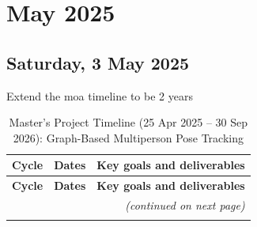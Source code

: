 \chapter[2025 May]{May 2025}

\section[2025/03/05]{Saturday, 3 May 2025}
\label{sec:20250305}

Extend the moa timeline to be 2 years

\begin{longtable}{@{} c c p{10.5cm} @{}}
\caption{Master's Project Timeline (25 Apr 2025 -- 30 Sep 2026): Graph-Based Multiperson Pose Tracking}
\label{tab:masters-timeline-v2}\\

\toprule
\textbf{Cycle} & \textbf{Dates} & \textbf{Key goals and deliverables} \\
\midrule
\endfirsthead

\toprule
\textbf{Cycle} & \textbf{Dates} & \textbf{Key goals and deliverables} \\
\midrule
\endhead

\midrule
\multicolumn{3}{r}{\small\itshape (continued on next page)}\\
\endfoot


\end{longtable}
